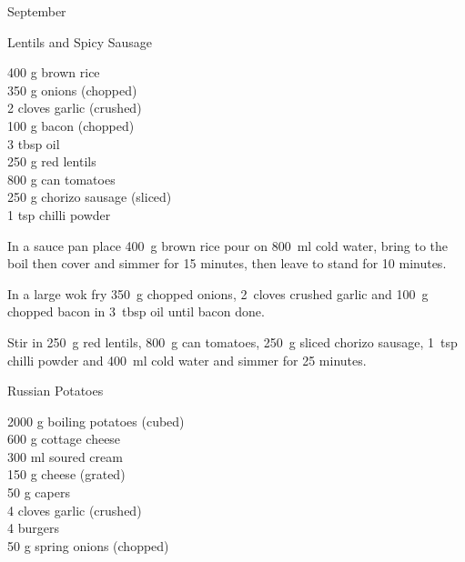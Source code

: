 \begin{menu}{September}
    \begin{recipe}{2}{Lentils and Spicy Sausage}%
		\begin{ingredients}
		400 g brown rice  \\
	350 g onions (chopped) \\
	2 cloves garlic (crushed) \\
	100 g bacon (chopped) \\
	3 tbsp oil  \\
	250 g red lentils  \\
	800 g can tomatoes  \\
	250 g chorizo sausage (sliced) \\
	1 tsp chilli powder  \\
	
		\end{ingredients}
	
	
    \begin{instructions}
    \item 
    In a
    sauce pan
    place
    400~g  brown rice
    pour on
    800~ml  cold water,
    bring to the boil then cover and simmer for 15 minutes,
    then leave to stand for 10 minutes.
  \item 
        In a large wok fry
        350~g chopped onions,
        2~cloves crushed garlic
        and
        100~g chopped bacon
        in
        3~tbsp  oil
        until bacon done.
      \item 
        Stir in
        250~g  red lentils,
        800~g  can tomatoes,
        250~g sliced chorizo sausage,
        1~tsp  chilli powder
        and
        400~ml  cold water
        and simmer for 25 minutes.
      
    \end{instructions}
    \end{recipe}%
  
    \begin{recipe}{2}{Russian Potatoes}%
		\begin{ingredients}
		2000 g boiling potatoes (cubed) \\
	600 g cottage cheese  \\
	300 ml soured cream  \\
	150 g cheese (grated) \\
	50 g capers  \\
	4 cloves garlic (crushed) \\
	4  burgers  \\
	50 g spring onions (chopped) \\
	

\end{ingredients}
\end{recipe}
\end{menu}
